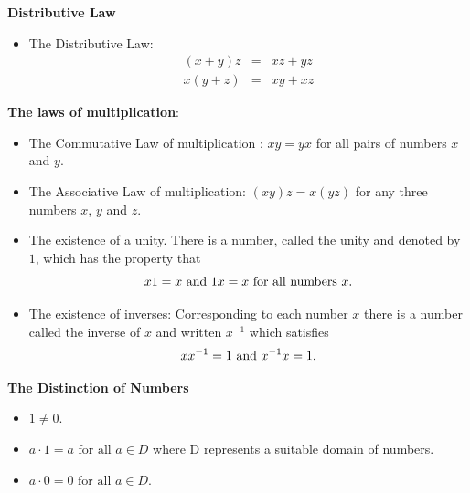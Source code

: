 \begin{definition}{\bf Distributive Law}
\begin{itemize}
\item[D1:] The Distributive Law:
\begin{eqnarray*}
(x+y)z &=& xz + yz\\
x(y+z) &=& xy + xz
\end{eqnarray*}
\end{itemize}
\end{definition}

\begin{definition}{\bf The laws of multiplication}:\\
\begin{itemize}
\item[M1:] The Commutative Law of multiplication : $x y = y x$ for all pairs of numbers $x$ and $y$.
\item[M2:] The Associative Law of multiplication: $(xy)z = x (yz)$ for any three numbers $x$, $y$ and $z$.
\item[M3:] The existence of a unity. There is a number, called the unity and denoted by $1$, which has the property that
$$ x1= x \hbox{~and~} 1x = x \hbox{~for all numbers~} x.$$
\item[M4:] The existence of inverses: Corresponding to each number $x$ there is a number called the inverse of $x$ and written $x^{-1}$ which satisfies
$$xx^{-1} = 1\hbox{~and~} x^{-1}x = 1.$$
\end{itemize}
\end{definition}

\begin{definition}{\bf The Distinction of Numbers}
\begin{itemize}
\item[X1:] $1 \ne 0$.
\item[] $a\cdot1 = a \mbox{ for all } a \in D$ where D represents a suitable domain of numbers.
\item[] $a\cdot0 = 0 \mbox{ for all } a \in D.$ 
\end{itemize}
\end{definition}